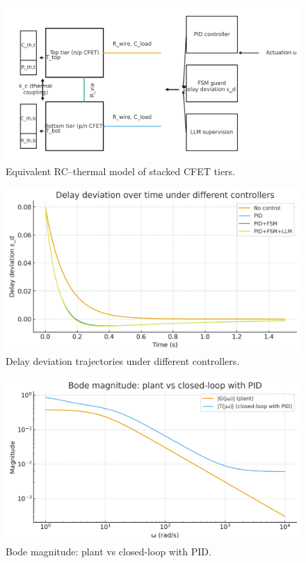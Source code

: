 \documentclass[conference]{IEEEtran}
\begin{document}
\begin{figure}[t]
\centering
\includegraphics[width=\columnwidth]{figs/fig1_cfet_rc_thermal_equiv.png}
\caption{Equivalent RC--thermal model of stacked CFET tiers.}
\label{fig:equiv}
\end{figure}

\begin{figure}[t]
\centering
\includegraphics[width=\columnwidth]{figs/fig2_time_response.png}
\caption{Delay deviation trajectories under different controllers.}
\label{fig:delay}
\end{figure}

\begin{figure}[t]
\centering
\includegraphics[width=\columnwidth]{figs/fig3_bode_magnitude.png}
\caption{Bode magnitude: plant vs closed-loop with PID.}
\label{fig:bode}
\end{figure}
\end{document}
